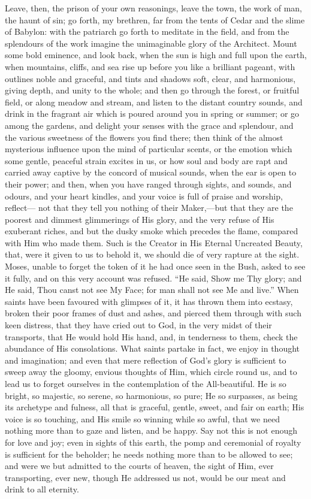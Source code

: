 Leave, then, the prison of your own reasonings, leave the town, the
work of man, the haunt of sin; go forth, my brethren, far from the
tents of Cedar and the slime of Babylon: with the patriarch go forth
to meditate in the field, and from the splendours of the work imagine
the unimaginable glory of the Architect. Mount some bold eminence, and
look back, when the sun is high and full upon the earth, when
mountains, cliffs, and sea rise up before you like a brilliant
pageant, with outlines noble and graceful, and tints and shadows soft,
clear, and harmonious, giving depth, and unity to the whole; and then
go through the forest, or fruitful field, or along meadow and stream,
and listen to the distant country sounds, and drink in the fragrant
air which is poured around you in spring or summer; or go among the
gardens, and delight your senses with the grace and splendour, and the
various sweetness of the flowers you find there; then think of the
almost mysterious influence upon the mind of particular scents, or the
emotion which some gentle, peaceful strain excites in us, or how soul
and body are rapt and carried away captive by the concord of musical
sounds, when the ear is open to their power; and then, when you have
ranged through sights, and sounds, and odours, and your heart kindles,
and your voice is full of praise and worship, reflect— not that they
tell you nothing of their Maker,—but that they are the poorest and
dimmest glimmerings of His glory, and the very refuse of His exuberant
riches, and but the dusky smoke which precedes the flame, compared
with Him who made them. Such is the Creator in His Eternal Uncreated
Beauty, that, were it given to us to behold it, we should die of very
rapture at the sight. Moses, unable to forget the token of it he had
once seen in the Bush, asked to see it fully, and on this very account
was refused. ``He said, Show me Thy glory; and He said, Thou canst
not see My Face; for man shall not see Me and live.'' When saints
have been favoured with glimpses of it, it has thrown them into
ecstasy, broken their poor frames of dust and ashes, and pierced them
through with such keen distress, that they have cried out to God, in
the very midst of their transports, that He would hold His hand, and,
in tenderness to them, check the abundance of His consolations. What
saints partake in fact, we enjoy in thought and imagination; and even
that mere reflection of God's glory is sufficient to sweep away the
gloomy, envious thoughts of Him, which circle round us, and to lead us
to forget ourselves in the contemplation of the All-beautiful. He is
so bright, so majestic, so serene, so harmonious, so pure; He so
surpasses, as being its archetype and fulness, all that is graceful,
gentle, sweet, and fair on earth; His voice is so touching, and His
smile so winning while so awful, that we need nothing more than to
gaze and listen, and be happy. Say not this is not enough for love and
joy; even in sights of this earth, the pomp and ceremonial of royalty
is sufficient for the beholder; he needs nothing more than to be
allowed to see; and were we but admitted to the courts of heaven, the
sight of Him, ever transporting, ever new, though He addressed us not,
would be our meat and drink to all eternity.


